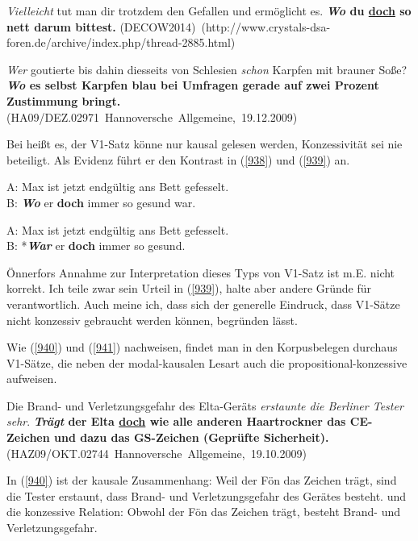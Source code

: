 {\begin{exe}
	\ex\label{936}
	\scriptsize
	\emph{Vielleicht} tut man dir trotzdem den Gefallen und ermöglicht es. \textbf{\textit{Wo} du \underline{doch} so nett darum bittest.}       
	\newline  
	\hbox{}\hfill\hbox{(DECOW2014) (http://www.crystals-dsa-foren.de/archive/index.php/thread-2885.html)}
\end{exe}
	
\begin{exe}
	\ex\label{937}
	\scriptsize
	\emph{Wer} goutierte bis dahin diesseits von Schlesien \emph{schon} Karpfen mit brauner Soße? \textbf{\textit{Wo} es selbst Karpfen blau bei Umfragen 		gerade auf zwei Prozent Zustimmung bringt.	     }
	\newline  
	\hbox{}\hfill\hbox{(HA09/DEZ.02971 Hannoversche Allgemeine, 19.12.2009)}
\end{exe}	
Bei \citet[161]{Oennerfors1997} heißt es, der V1-Satz könne nur kausal gelesen werden, Konzessivität sei nie beteiligt. Als Evidenz führt er den Kontrast in (\ref{938}) und (\ref{939}) an.

\begin{exe}
	\ex\label{938}
	A: Max ist jetzt endgültig ans Bett gefesselt.\\
	B: \textbf{\textit{Wo}} er \textbf{doch} immer so gesund war.	
	\hfill\hbox{\citet[203]{Oppenrieder1989}}
\end{exe}	

\begin{exe}
	\ex\label{939}
	A: Max ist jetzt endgültig ans Bett gefesselt.\\
	B: *\textbf{\textit{War}} er \textbf{doch} immer so gesund.	
	\hfill\hbox{\citet[161]{Oennerfors1997}}
\end{exe}
Önnerfors Annahme zur Interpretation dieses Typs von V1-Satz ist m.E. nicht korrekt. Ich teile zwar sein Urteil in (\ref{939}), halte aber andere Gründe für verantwortlich. Auch meine ich, dass sich der generelle Eindruck, dass V1-Sätze nicht konzessiv gebraucht werden können, begründen lässt.

Wie (\ref{940}) und (\ref{941}) nachweisen, findet man in den Korpusbelegen durchaus V1-Sätze, die neben der modal-kausalen Lesart auch die propositional-konzessive aufweisen.

\begin{exe}
	\ex\label{940}
	\scriptsize
	Die Brand- und Verletzungsgefahr des Elta-Geräts \emph{erstaunte die Berliner Tester sehr}. \textbf{\textit{Trägt} der Elta \underline{doch} wie alle 		anderen Haartrockner das CE-Zeichen und dazu das GS-Zeichen (Geprüfte Sicherheit).   	}
	\hfill\hbox{(HAZ09/OKT.02744 Hannoversche Allgemeine, 19.10.2009)}
\end{exe}
In (\ref{940}) ist der kausale Zusammenhang: \glq Weil der Fön das Zeichen trägt, sind die Tester erstaunt, dass Brand- und Verletzungsgefahr des Gerätes besteht.\grq {} und die konzessive Relation: \glq Obwohl der Fön das Zeichen trägt, besteht Brand- und Verletzungsgefahr.\grq {}

}
